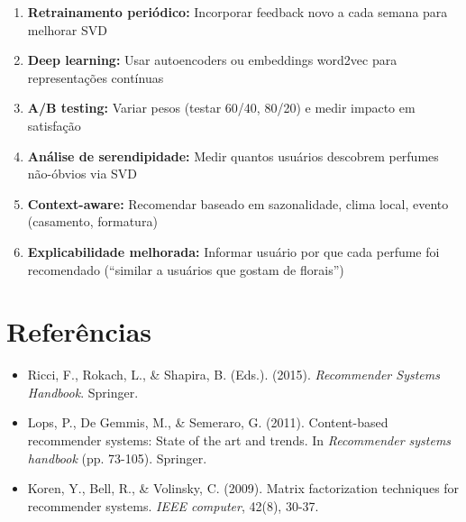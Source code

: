 \documentclass[12pt,a4paper]{article}
\begin{document}
\begin{enumerate}
    \item \textbf{Retrainamento periódico:} Incorporar feedback novo a cada semana para melhorar SVD
    
    \item \textbf{Deep learning:} Usar autoencoders ou embeddings word2vec para representações contínuas
    
    \item \textbf{A/B testing:} Variar pesos (testar 60/40, 80/20) e medir impacto em satisfação
    
    \item \textbf{Análise de serendipidade:} Medir quantos usuários descobrem perfumes não-óbvios via SVD
    
    \item \textbf{Context-aware:} Recomendar baseado em sazonalidade, clima local, evento (casamento, formatura)
    
    \item \textbf{Explicabilidade melhorada:} Informar usuário por que cada perfume foi recomendado (``similar a usuários que gostam de florais'')
\end{enumerate}

\section*{Referências}

\begin{itemize}
    \item Ricci, F., Rokach, L., \& Shapira, B. (Eds.). (2015). \textit{Recommender Systems Handbook}. Springer.
    \item Lops, P., De Gemmis, M., \& Semeraro, G. (2011). Content-based recommender systems: State of the art and trends. In \textit{Recommender systems handbook} (pp. 73-105). Springer.
    \item Koren, Y., Bell, R., \& Volinsky, C. (2009). Matrix factorization techniques for recommender systems. \textit{IEEE computer}, 42(8), 30-37.
\end{itemize}
\end{document}

